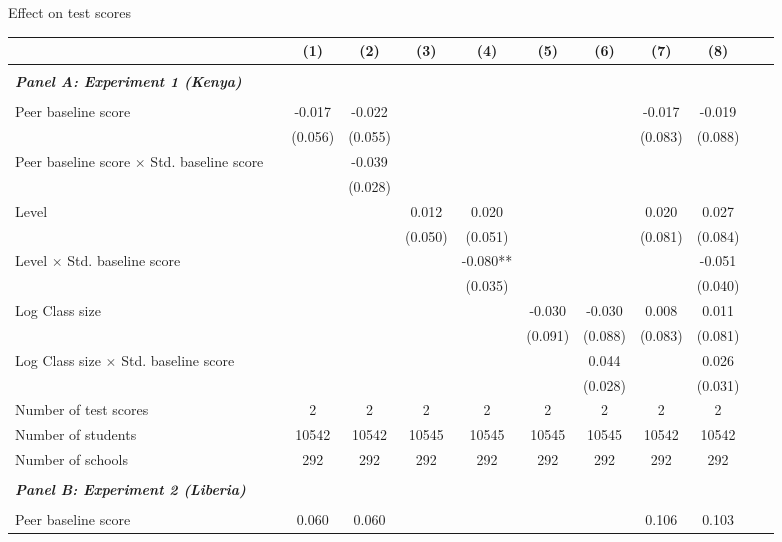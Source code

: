 \begin{center} 
\caption{\small Effect on test scores} 
\label{tab:descriptives} 
\begin{scriptsize}
\begin{threeparttable}
\begin{tabular} {@{} l l c c c c c c c c c c  @{}} \toprule \toprule
& &(1)&(2)&(3)&(4)&(5)&(6)&(7)&(8) \\ \midrule 
\\
\multicolumn{3}{l}{\textbf{\textit{Panel A: Experiment 1 (Kenya)}}} \\
\\
Peer baseline score &  & -0.017 & -0.022 &  &  &  &  & -0.017 & -0.019 \\
                 &  & (0.056) & (0.055) &  &  &  &  & (0.083) & (0.088) \\
Peer baseline score $\times$ Std. baseline score &  &  & -0.039 &  &  &  &  &  &  \\
                 &  &  & (0.028) &  &  &  &  &  &  \\
Level &  &  &  & 0.012 & 0.020 &  &  & 0.020 & 0.027 \\
                 &  &  &  & (0.050) & (0.051) &  &  & (0.081) & (0.084) \\
Level $\times$ Std. baseline score &  &  &  &  & -0.080** &  &  &  & -0.051 \\
                 &  &  &  &  & (0.035) &  &  &  & (0.040) \\
Log Class size &  &  &  &  &  & -0.030 & -0.030 & 0.008 & 0.011 \\
                 &  &  &  &  &  & (0.091) & (0.088) & (0.083) & (0.081) \\
Log Class size $\times$ Std. baseline score &  &  &  &  &  &  & 0.044 &  & 0.026 \\
                 &  &  &  &  &  &  & (0.028) &  & (0.031) \\
\midrule
Number of test scores &  & 2 & 2 & 2 & 2 & 2 & 2 & 2 & 2 \\
Number of students &  & 10542 & 10542 & 10545 & 10545 & 10545 & 10545 & 10542 & 10542 \\
Number of schools &  & 292 & 292 & 292 & 292 & 292 & 292 & 292 & 292 \\
 \midrule
\\
\multicolumn{3}{l}{\textbf{\textit{Panel B: Experiment 2 (Liberia)}}} \\
\\
Peer baseline score &  & 0.060 & 0.060 &  &  &  &  & 0.106 & 0.103 \\

\end{tabular}
\end{threeparttable}
\end{scriptsize}
\end{center}

